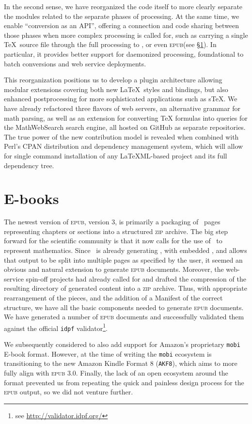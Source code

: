 \documentclass{llncs}
\def\ebook{\mbox{E-book}\xspace}
\def\ebooks{\mbox{E-books}\xspace}
\def\epub{\textsc{epub}\xspace}
\def\zip{\textsc{zip}\xspace}
\begin{document}
In the second sense, we have reorganized the code itself to more clearly
separate the modules related to the separate phases of processing.
At the same time, we enable ``conversion as an API'', offering a connection and code sharing between those phases when more
complex processing is called for, such as carrying a single \TeX\ source
file through the full processing to \HTML, or even \epub (see \S\ref{ebooks}).
In particular, it provides better support for daemonized processing, foundational to batch conversions and web service deployments.

This reorganization positions us to develop a plugin architecture allowing modular extensions
covering both new \LaTeX\ styles and bindings, but also
enhanced postprocessing for more sophisticated applications such as s\TeX.
We have already refactored three flavors of {\LaTeXML} web servers,
an alternative grammar for math parsing,
as well as an extension for converting {\TeX} formulas into queries for the MathWebSearch search engine, all hosted on GitHub as separate repositories.
The true power of the new contribution model is revealed when combined with Perl's CPAN distribution and dependency management system,
 which will allow for single command installation of any LaTeXML-based project and its full dependency tree.

\section{\ebooks}\label{ebooks}
The newest version of \epub, version 3, is primarily a packaging
of \HTML\ pages representing chapters or sections into a structured
\zip archive. The big step forward for the scientific community
is that it now calls for the use of \MathML\
to represent mathematics. Since \LaTeXML\ is already generating \HTML,
with embedded \MathML, and allows that output to be split into
multiple pages as specified by the user, it seemed an obvious
and natural extension to generate \epub documents. Moreover, the
web-service spin-off projects had already called for and drafted the compression of the resulting
directory of generated content into a \zip
archive.  Thus, with appropriate rearrangement of the pieces,
and the addition of a Manifest of the correct structure,
we have all the basic components needed to generate \epub documents. We have generated a number of \epub documents and successfully validated them against the official \texttt{idpf} validator\footnote{see \url{http://validator.idpf.org/}}.

We subsequently considered to also add support for Amazon's proprietary \texttt{mobi} \ebook format. However, at the time of writing the \texttt{mobi} ecosystem is transitioning to the new Amazon Kindle Format 8 (\texttt{AKF8}), which aims to more fully align with \epub 3.0. Finally, the lack of an open ecosystem around the format prevented us from repeating the quick and painless design process for the \epub output, so we did not venture further.
\end{document}
